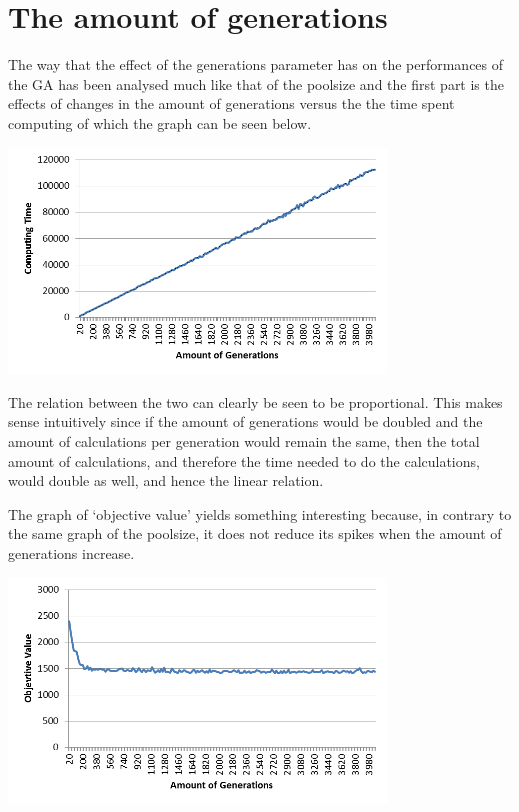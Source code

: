 \section{The amount of generations}

\par
The way that the effect of the generations parameter has on the performances of the GA has been analysed much like that of the poolsize and the first part is the effects of changes in the amount of generations versus the the time spent computing of which the graph can be seen below.
\begin{centering}
	\includegraphics[height=6cm]{CTG}
\end{centering}
\par
The relation between the two can clearly be seen to be proportional. This makes sense intuitively since if the amount of generations would be doubled and the amount of calculations per generation would remain the same, then the total amount of calculations, and therefore the time needed to do the calculations, would double as well, and hence the linear relation.
\par
The graph of ‘objective value’ yields something interesting because, in contrary to the same graph of the poolsize, it does not reduce its spikes when the amount of generations increase.

	\includegraphics[height=6cm]{OVG}

